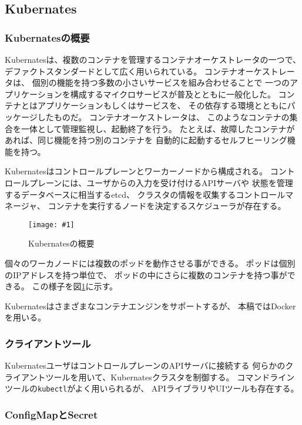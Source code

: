 \documentclass[submit,techrep]{ipsj}
\newcommand{\reffig}[1]{図\ref{#1}}
\newcommand{\epsfig}[4]{
\begin{figure}[tb]
  \begin{center}
    \texttt{[image: \#1]}
  \end{center}
  \caption{#3}
  \label{#4}
\end{figure}}
\newcommand{\kbs}{Kubernates}
\begin{document}
\subsection{\kbs}
\subsubsection{\kbs の概要}
\kbs\cite{k8s}は、複数のコンテナを管理するコンテナオーケストレータの一つで、
デファクトスタンダードとして広く用いられている。
コンテナオーケストレータは、
個別の機能を持つ多数の小さいサービスを組み合わせることで
一つのアプリケーションを構成するマイクロサービスが普及とともに一般化した。
コンテナとはアプリケーションもしくはサービスを、
その依存する環境とともにパッケージしたものだ。
コンテナオーケストレータは、
このようなコンテナの集合を一体として管理監視し、起動終了を行う。
たとえば、故障したコンテナがあれば、同じ機能を持つ別のコンテナを
自動的に起動するセルフヒーリング機能を持つ。

\kbs はコントロールプレーンとワーカーノードから構成される。
コントロールプレーンには、ユーザからの入力を受け付けるAPIサーバや
状態を管理するデータベースに相当するetcd、
クラスタの情報を収集するコントロールマネージャ、
コンテナを実行するノードを決定するスケジューラが存在する。

\epsfig{figs/kubernetes.pdf}{width=8.5cm}{\kbs の概要}{kubernetes}

個々のワーカノードには複数のポッドを動作させる事ができる。
ポッドは個別のIPアドレスを持つ単位で、
ポッドの中にさらに複数のコンテナを持つ事ができる。
この様子を\reffig{kubernetes}に示す。

\kbs はさまざまなコンテナエンジンをサポートするが、
本稿ではDockerを用いる。

\subsubsection{クライアントツール}
\kbs ユーザはコントロールプレーンのAPIサーバに接続する
何らかのクライアントツールを用いて、\kbs クラスタを制御する。
コマンドラインツールの\verb|kubectl|がよく用いられるが、
APIライブラリやUIツールも存在する。




\subsubsection{ConfigMapとSecret}
\end{document}
